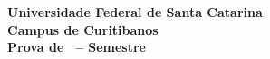 \documentclass[10pt,a4paper]{article}
\makeatletter
\newcommand{\myCourse}{\@Course}
\newcommand{\mySemester}{\@Semester}
\newcommand{\myID}{\@ID}
\makeatother
\begin{document}
\thispagestyle{empty}
{\sf
\begin{center}
    \textbf{\LARGE Universidade Federal de Santa Catarina}\\[0.15cm]
    \textbf{\Large Campus de Curitibanos}\\[0.5cm]
    \textbf{\large Prova de \myCourse \ -- Semestre \mySemester} \hfill \textbf{\myID}
\end{center}

\vspace{0.3cm}

\noindent{}
}

\vspace*{0.8cm}

\begin{enumerate}
\setlength{\itemsep}{1.5em} %
\end{enumerate}
\end{document}

